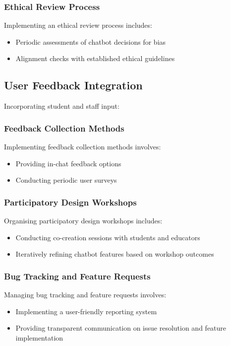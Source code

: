 \documentclass[15pt,a4paper]{article}
\begin{document}
\begin{multicols}{2}
\subsubsection*{Ethical Review Process}
Implementing an ethical review process \textit{\parencite{FloridiCowls2023}} includes:
\begin{itemize}
    \item Periodic assessments of chatbot decisions for bias
    \item Alignment checks with established ethical guidelines
\end{itemize}

\subsection{User Feedback Integration}
Incorporating student and staff input:

\subsubsection*{Feedback Collection Methods}
Implementing feedback collection methods \textit{\parencite[pp. 100-150]{TullisAlbert2024}} involves:
\begin{itemize}
    \item Providing in-chat feedback options
    \item Conducting periodic user surveys
\end{itemize}

\subsubsection*{Participatory Design Workshops}
Organising participatory design workshops \textit{\parencite[pp. 50-100]{SimonsenRobertson2023}} includes:
\begin{itemize}
    \item Conducting co-creation sessions with students and educators
    \item Iteratively refining chatbot features based on workshop outcomes
\end{itemize}

\subsubsection*{Bug Tracking and Feature Requests}
Managing bug tracking and feature requests \textit{\parencite{Atlassian2024}} involves:
\begin{itemize}
    \item Implementing a user-friendly reporting system
    \item Providing transparent communication on issue resolution and feature implementation
\end{itemize}


\end{multicols}
\end{document}
